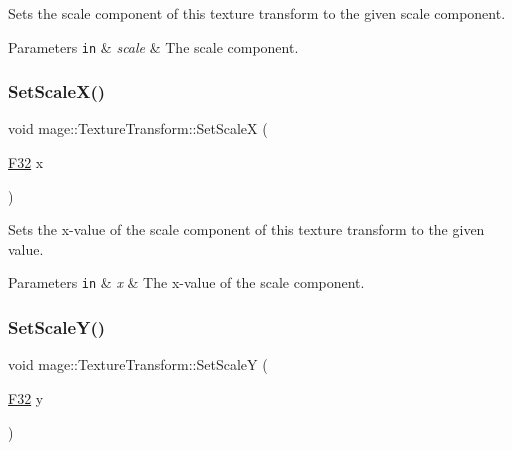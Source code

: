 Sets the scale component of this texture transform to the given scale component.


\begin{DoxyParams}[1]{Parameters}
\mbox{\tt in}  & {\em scale} & The scale component. \\
\hline
\end{DoxyParams}
\hypertarget{classmage_1_1_texture_transform_ae038a7bf4d879c67e898db1fc8093900}{}\label{classmage_1_1_texture_transform_ae038a7bf4d879c67e898db1fc8093900} 
\subsubsection{\texorpdfstring{Set\+Scale\+X()}{SetScaleX()}}
{\footnotesize\ttfamily void mage\+::\+Texture\+Transform\+::\+Set\+ScaleX (\begin{DoxyParamCaption}\item[{\hyperlink{namespacemage_aa97e833b45f06d60a0a9c4fc22ae02c0}{F32}}]{x }\end{DoxyParamCaption})\hspace{0.3cm}{\ttfamily [noexcept]}}

Sets the x-\/value of the scale component of this texture transform to the given value.


\begin{DoxyParams}[1]{Parameters}
\mbox{\tt in}  & {\em x} & The x-\/value of the scale component. \\
\hline
\end{DoxyParams}
\hypertarget{classmage_1_1_texture_transform_a4bde9ccfddadb77589d0703bd7e394b6}{}\label{classmage_1_1_texture_transform_a4bde9ccfddadb77589d0703bd7e394b6} 
\subsubsection{\texorpdfstring{Set\+Scale\+Y()}{SetScaleY()}}
{\footnotesize\ttfamily void mage\+::\+Texture\+Transform\+::\+Set\+ScaleY (\begin{DoxyParamCaption}\item[{\hyperlink{namespacemage_aa97e833b45f06d60a0a9c4fc22ae02c0}{F32}}]{y }\end{DoxyParamCaption})\hspace{0.3cm}{\ttfamily [noexcept]}}

